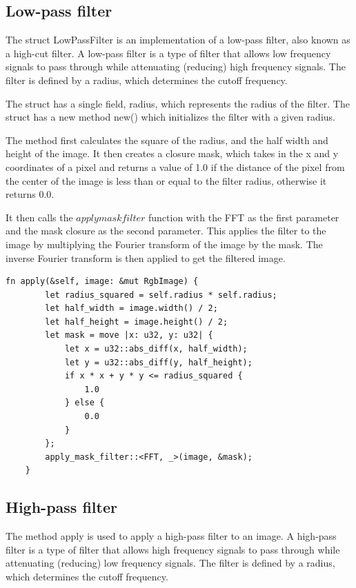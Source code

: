 \documentclass[12pt]{article}
\begin{document}
\subsection{Low-pass filter}
The struct LowPassFilter is an implementation of a low-pass filter, also known as a high-cut filter. A low-pass filter is a type of filter that allows low frequency signals to pass through while attenuating (reducing) high frequency signals. The filter is defined by a radius, which determines the cutoff frequency.

The struct has a single field, radius, which represents the radius of the filter. The struct has a new method new() which initializes the filter with a given radius.

The method first calculates the square of the radius, and the half width and height of the image. It then creates a closure mask, which takes in the x and y coordinates of a pixel and returns a value of 1.0 if the distance of the pixel from the center of the image is less than or equal to the filter radius, otherwise it returns 0.0.

It then calls the $apply mask filter$ function with the FFT as the first parameter and the mask closure as the second parameter. This applies the filter to the image by multiplying the Fourier transform of the image by the mask. The inverse Fourier transform is then applied to get the filtered image.

\begin{lstlisting}
fn apply(&self, image: &mut RgbImage) {
        let radius_squared = self.radius * self.radius;
        let half_width = image.width() / 2;
        let half_height = image.height() / 2;
        let mask = move |x: u32, y: u32| {
            let x = u32::abs_diff(x, half_width);
            let y = u32::abs_diff(y, half_height);
            if x * x + y * y <= radius_squared {
                1.0
            } else {
                0.0
            }
        };
        apply_mask_filter::<FFT, _>(image, &mask);
    }
\end{lstlisting}
\subsection{High-pass filter}
The method apply is used to apply a high-pass filter to an image. A high-pass filter is a type of filter that allows high frequency signals to pass through while attenuating (reducing) low frequency signals. The filter is defined by a radius, which determines the cutoff frequency.
\end{document}
